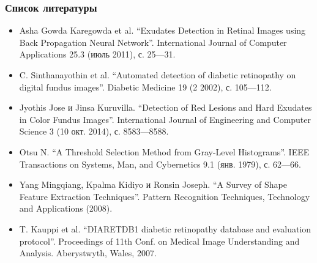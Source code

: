 \documentclass{beamer}
\begin{document}
\begin{frame}
\frametitle{Список литературы}
	\scriptsize{
	\begin{itemize}
		\item Asha Gowda Karegowda et al. “Exudates Detection in Retinal Images using Back Propagation Neural Network”. International Journal of Computer Applications 25.3 (июль 2011), с. 25—31.
		\item C. Sinthanayothin et al. “Automated detection of diabetic retinopathy on digital fundus images”. Diabetic Medicine 19 (2 2002), с. 105—112.
		\item Jyothis Jose и Jinsa Kuruvilla. “Detection of Red Lesions and Hard Exudates in Color Fundus Images”. International Journal of Engineering and Computer Science 3 (10 окт. 2014), с. 8583—8588.
		\item Otsu N. “A Threshold Selection Method from Gray-Level Histograms”. IEEE Transactions on Systems, Man, and Cybernetics 9.1 (янв. 1979), с. 62—66.
		\item Yang Mingqiang, Kpalma Kidiyo и Ronsin Joseph. “A Survey of Shape Feature Extraction Techniques”. Pattern Recognition Techniques, Technology and Applications (2008).
		\item T. Kauppi et al. “DIARETDB1 diabetic retinopathy database and evaluation protocol”. Proceedings of 11th Conf. on Medical Image Understanding and Analysis. Aberystwyth, Wales, 2007.
	\end{itemize}}
\end{frame}
\end{document}
